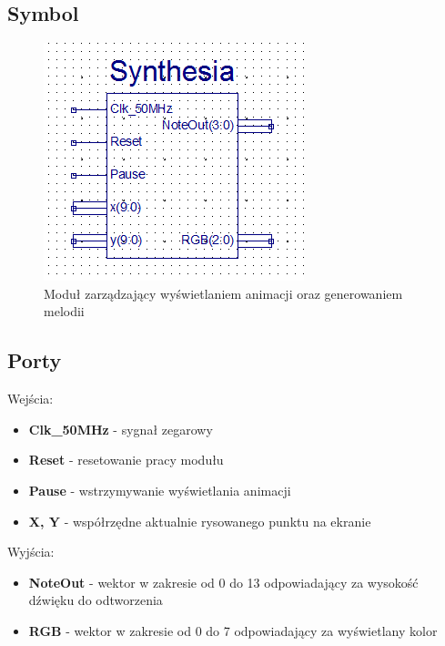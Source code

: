 \documentclass[a4paper]{report}
\begin{document}
		\subsection{Symbol}
			\begin{figure}[h!]
				\centering
				\includegraphics{synthesia2.png}
				\caption{Moduł zarządzający wyświetlaniem animacji oraz generowaniem melodii}
			\end{figure}
		\subsection{Porty}
		{\Large Wejścia:}
			\begin{itemize}	 
				\item	\textbf{Clk\_50MHz} - sygnał zegarowy
				\item \textbf{Reset} - resetowanie pracy modułu
				\item 	\textbf{Pause} - wstrzymywanie wyświetlania animacji
				\item \textbf{X, Y} - współrzędne aktualnie rysowanego punktu na ekranie
			\end{itemize}
		{\Large Wyjścia:}
			\begin{itemize} 
				\item 	\textbf{NoteOut} - wektor w zakresie od 0 do 13 odpowiadający za wysokość dźwięku do odtworzenia
				\item 	\textbf{RGB} - wektor w zakresie od 0 do 7 odpowiadający za wyświetlany kolor
			\end{itemize}
\end{document}
